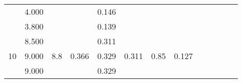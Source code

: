 \documentclass[a4paper,12pt]{article}
\begin{document}
\begin{table}[htp]
\begin{tabular}{|c|c|c|c|c|c|c|c|c|c|c|c|c|}
                       & 4.000                   &                                       &                        & 0.146 &                        &                        &                        &                                                                &                                                            &                                                          &                                                          &                        \\ \cline{2-2} \cline{5-5}
                       & 3.800                   &                                       &                        & 0.139 &                        &                        &                        &                                                                &                                                            &                                                          &                                                          &                        \\ \cline{1-8}
\multirow{5}{*}{10}    & 8.500                   & \multirow{5}{*}{8.8}                  & \multirow{5}{*}{0.366} & 0.311 & \multirow{5}{*}{0.311} & \multirow{5}{*}{0.85}  & \multirow{5}{*}{0.127} &                                                                &                                                            &                                                          &                                                          &                        \\ \cline{2-2} \cline{5-5}
                       & 9.000                   &                                       &                        & 0.329 &                        &                        &                        &                                                                &                                                            &                                                          &                                                          &                        \\ \cline{2-2} \cline{5-5}
                       & 9.000                   &                                       &                        & 0.329 &                        &                        &                        &                                                                &                                                            &                                                          &                                                          &                        \\ \cline{2-2} \cline{5-5}

\end{tabular}
\end{table}
\end{document}
